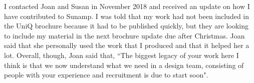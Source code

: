 I contacted Joan and Susan in November 2018 and received an update on how I have contributed to Sunamp.
I was told that my work had not been included in the UniQ brochure because it had to be published quickly, but they are looking to include my material in the next brochure update due after Christmas.
Joan said that she personally used the work that I produced and that it helped her a lot.
Overall, though, Joan said that, ``The biggest legacy of your work here I think is that we now understand what we need in a design team, consisting of people with your experience and recruitment is due to start soon".





